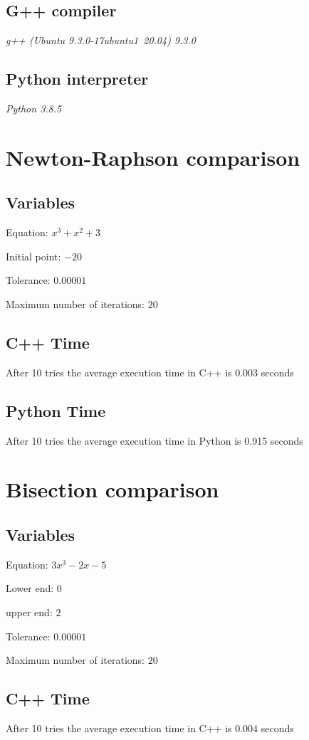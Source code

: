 \documentclass[conference]{IEEEtran}
\begin{document}
\subsection{G++ compiler}
\textit{g++ (Ubuntu 9.3.0-17ubuntu1~20.04) 9.3.0}

\subsection{Python interpreter}
\textit{Python 3.8.5}

\section{Newton-Raphson comparison}
\subsection{Variables}

Equation: \(x^3 + x^2 + 3\) 

Initial point: \(-20\)

Tolerance: \(0.00001\) 

Maximum number of iterations: \(20\)

\subsection{C++ Time}
After 10 tries the average execution time in C++ is 0.003 seconds

\subsection{Python Time}
After 10 tries the average execution time in Python is 0.915 seconds

\section{Bisection comparison}
\subsection{Variables}

Equation: \(3x^3 - 2x -5\) 

Lower end: \(0\)

upper end: \(2\)

Tolerance: \(0.00001\) 

Maximum number of iterations: \(20\)

\subsection{C++ Time}
After 10 tries the average execution time in C++ is 0.004 seconds
\end{document}
